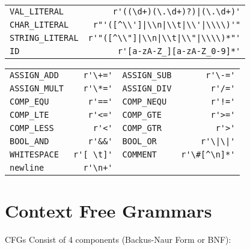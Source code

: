 \documentclass[10pt,landscape]{article}
\begin{document}
\begin{multicols}{3}
		\begin{tabular}{ l r }
			  \verb|VAL_LITERAL|    & \verb!r'((\d+)(\.\d+)?)|(\.\d+)'! \\
			  \verb|CHAR_LITERAL| & \verb!r"'([^\\']|\\n|\\t|\\'|\\\\)'"! \\
			  \verb|STRING_LITERAL| & \verb!r'"([^\\"]|\\n|\\t|\\"|\\\\)*"'!\\
			  \verb|ID| & \verb|r'[a-zA-Z_][a-zA-Z_0-9]*'|
		\end{tabular} 
		\begin{tabular}{ l r | l r }
			  \verb|ASSIGN_ADD| & \verb|r'\+='| &
			  \verb|ASSIGN_SUB| & \verb|r'\-='| \\
			  \verb|ASSIGN_MULT| & \verb|r'\*='| &
			  \verb|ASSIGN_DIV| & \verb|r'/='| \\
			  \verb|COMP_EQU| & \verb|r'=='| &
			  \verb|COMP_NEQU| & \verb|r'!='| \\
			  \verb|COMP_LTE| & \verb|r'<='| &
			  \verb|COMP_GTE| & \verb|r'>='| \\
			  \verb|COMP_LESS| & \verb|r'<'| &
			  \verb|COMP_GTR| & \verb|r'>'| \\
			  \verb|BOOL_AND| & \verb|r'&&'| &
			  \verb|BOOL_OR| & \verb!r'\|\|'! \\
			  \verb|WHITESPACE| & \verb|r'[ \t]'| &
			  \verb|COMMENT| & \verb|r'\#[^\n]*'| \\
			  \verb|newline| & \verb|r'\n+'| 
		\end{tabular} 
		\section{Context Free Grammars}
        CFGs Consist of 4 components (Backus-Naur Form or BNF): 
          \begin{tabular}{p{}l}


\end{tabular}
\end{multicols}
\end{document}
